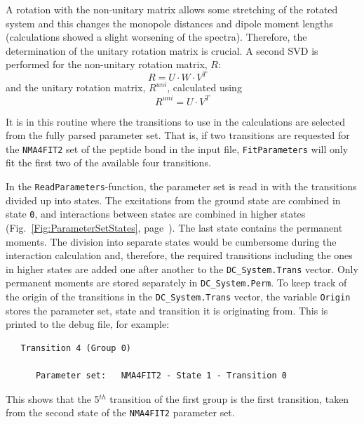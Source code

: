 \documentclass[11pt, letterpaper]{article}
\begin{document}
A rotation with the non-unitary matrix allows some stretching of the rotated system and this changes the monopole distances and dipole moment lengths (calculations showed a slight worsening of the spectra). Therefore, the determination of the unitary rotation matrix is crucial. A second SVD is performed for the non-unitary rotation matrix, $R$:
\begin{equation*}
R = U \cdot W \cdot V^T \quad
\end{equation*}
and the unitary rotation matrix, $R^{uni}$, calculated using
\begin{equation*}
R^{uni} = U \cdot V^T
\end{equation*}

It is in this routine where the transitions to use in the calculations are selected from the fully parsed parameter set. That is, if two transitions are requested for the \verb'NMA4FIT2' set of the peptide bond in the input file, \verb'FitParameters' will only fit the first two of the available four transitions.

In the \verb'ReadParameters'-function, the parameter set is read in with the transitions divided up into states. The excitations from the ground state are combined in state \verb'0', and interactions between states are combined in higher states (Fig.~\ref{Fig:ParameterSetStates}, page~\pageref{Fig:ParameterSetStates}). The last state contains the permanent moments. The division into separate states would be cumbersome during the interaction calculation and, therefore, the required transitions including the ones in higher states are added one after another to the \verb'DC_System.Trans' vector. Only permanent moments are stored separately in \verb'DC_System.Perm'. To keep track of the origin of the transitions in the \verb'DC_System.Trans' vector, the variable \verb'Origin' stores the parameter set, state and transition it is originating from. This is printed to the debug file, for example:
\begin{verbatim}
   Transition 4 (Group 0)
   
      Parameter set:   NMA4FIT2 - State 1 - Transition 0
\end{verbatim}

This shows that the 5$^{th}$ transition of the first group is the first transition, taken from the second state of the \verb'NMA4FIT2' parameter set.

\end{document}
